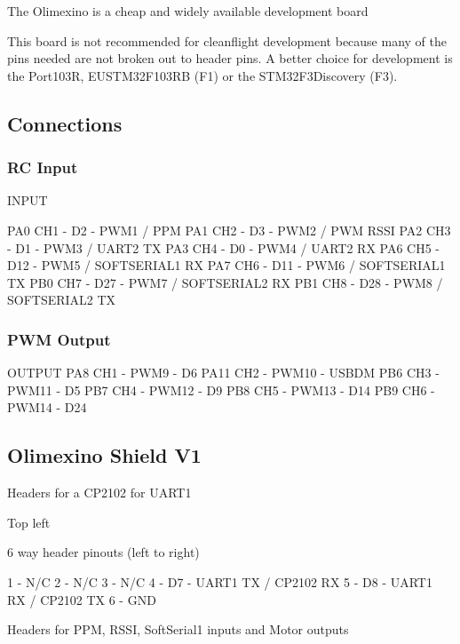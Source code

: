The Olimexino is a cheap and widely available development board

This board is not recommended for cleanflight development because many of the pins needed are not broken out to header pins. A better choice for development is the Port103\+R, E\+U\+S\+T\+M32\+F103\+R\+B (F1) or the S\+T\+M32\+F3\+Discovery (F3).

\subsection*{Connections}

\subsubsection*{R\+C Input}

I\+N\+P\+U\+T

P\+A0 C\+H1 -\/ D2 -\/ P\+W\+M1 / P\+P\+M P\+A1 C\+H2 -\/ D3 -\/ P\+W\+M2 / P\+W\+M R\+S\+S\+I P\+A2 C\+H3 -\/ D1 -\/ P\+W\+M3 / U\+A\+R\+T2 T\+X P\+A3 C\+H4 -\/ D0 -\/ P\+W\+M4 / U\+A\+R\+T2 R\+X P\+A6 C\+H5 -\/ D12 -\/ P\+W\+M5 / S\+O\+F\+T\+S\+E\+R\+I\+A\+L1 R\+X P\+A7 C\+H6 -\/ D11 -\/ P\+W\+M6 / S\+O\+F\+T\+S\+E\+R\+I\+A\+L1 T\+X P\+B0 C\+H7 -\/ D27 -\/ P\+W\+M7 / S\+O\+F\+T\+S\+E\+R\+I\+A\+L2 R\+X P\+B1 C\+H8 -\/ D28 -\/ P\+W\+M8 / S\+O\+F\+T\+S\+E\+R\+I\+A\+L2 T\+X

\subsubsection*{P\+W\+M Output}

O\+U\+T\+P\+U\+T P\+A8 C\+H1 -\/ P\+W\+M9 -\/ D6 P\+A11 C\+H2 -\/ P\+W\+M10 -\/ U\+S\+B\+D\+M P\+B6 C\+H3 -\/ P\+W\+M11 -\/ D5 P\+B7 C\+H4 -\/ P\+W\+M12 -\/ D9 P\+B8 C\+H5 -\/ P\+W\+M13 -\/ D14 P\+B9 C\+H6 -\/ P\+W\+M14 -\/ D24

\subsection*{Olimexino Shield V1}

Headers for a C\+P2102 for U\+A\+R\+T1

Top left

6 way header pinouts (left to right)

1 -\/ N/\+C 2 -\/ N/\+C 3 -\/ N/\+C 4 -\/ D7 -\/ U\+A\+R\+T1 T\+X / C\+P2102 R\+X 5 -\/ D8 -\/ U\+A\+R\+T1 R\+X / C\+P2102 T\+X 6 -\/ G\+N\+D

Headers for P\+P\+M, R\+S\+S\+I, Soft\+Serial1 inputs and Motor outputs

